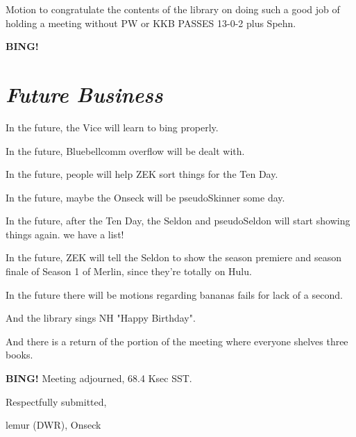 \documentclass[10pt]{article}
\newcommand{\bing}{{\bf BING!} }
\newcommand{\goto}[1]{\bing \vskip 12pt \section*{{\em{#1}}}}
\newcommand{\ps}{ plus Spehn\xspace}
\newcommand{\onseck}{lemur (DWR), Onseck}
\begin{document}
Motion to congratulate the contents of the library on doing
such a good job of holding a meeting without PW or KKB PASSES
13-0-2\ps.

\goto{Future Business}

In the future, the Vice will learn to bing properly.

In the future, Bluebellcomm overflow will be dealt with.

In the future, people will help ZEK sort things for the Ten
Day.

In the future, maybe the Onseck will be pseudoSkinner some day.

In the future, after the Ten Day, the Seldon and pseudoSeldon
will start showing things again.  we have a list!

In the future, ZEK will tell the Seldon to show the season premiere
and season finale of Season 1 of Merlin, since they're totally on Hulu.

In the future there will be motions regarding bananas fails for 
lack of a second.

And the library sings NH "Happy Birthday".

And there is a return of the portion of the meeting where everyone
shelves three books.

\bing
\noindent
Meeting adjourned, 68.4 Ksec SST.

\vspace{18pt}

\centerline{Respectfully submitted,}
\centerline{\onseck}
\end{document}
